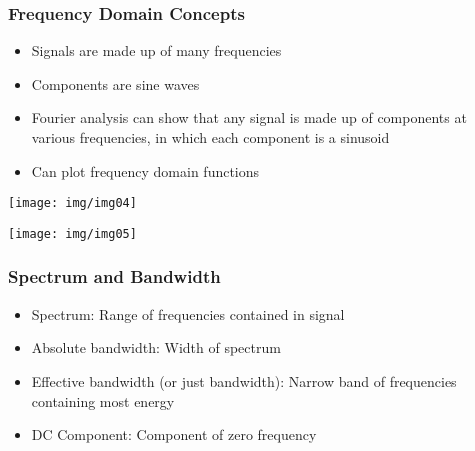 \documentclass[pdflatex,compress]{beamer}
\begin{document}
\begin{frame}
	\frametitle{Frequency Domain Concepts}
	\begin{itemize}
		\item Signals are made up of many frequencies
		\item Components are sine waves
		\item Fourier analysis can show that any signal is made up of components at various frequencies, in which each component is a sinusoid
		\item Can plot frequency domain functions
	\end{itemize}
\end{frame}

\begin{frame}
	\begin{center}
		\texttt{[image: img/img04]}
	\end{center}
\end{frame}

\begin{frame}
	\begin{center}
		\texttt{[image: img/img05]}
	\end{center}
\end{frame}

\begin{frame}
	\frametitle{Spectrum and Bandwidth}
	\begin{itemize}
		\item Spectrum: Range of frequencies contained in signal
		\item Absolute bandwidth: Width of spectrum
		\item Effective bandwidth (or just bandwidth): Narrow band of frequencies containing most energy
		\item DC Component: Component of zero frequency
	\end{itemize}
\end{frame}
\end{document}

